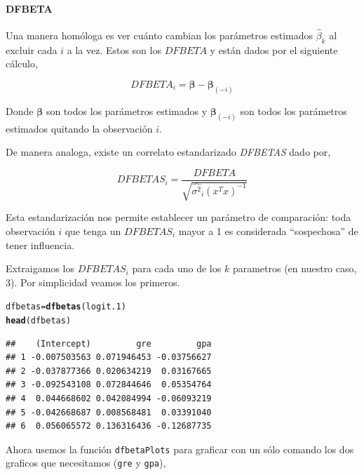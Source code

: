 \documentclass[onesided]{article}\usepackage[]{graphicx}\usepackage[]{color}
\makeatletter
\newcommand{\hlstd}[1]{\textcolor[rgb]{0.345,0.345,0.345}{#1}}%
\newcommand{\hlkwb}[1]{\textcolor[rgb]{0.69,0.353,0.396}{#1}}%
\newcommand{\hlkwd}[1]{\textcolor[rgb]{0.737,0.353,0.396}{\textbf{#1}}}%
\newenvironment{kframe}{%
 \def\at@end@of@kframe{}%
 \ifinner\ifhmode%
  \def\at@end@of@kframe{\end{minipage}}%
  \begin{minipage}{\columnwidth}%
 \fi\fi%
 \def\FrameCommand##1{\hskip\@totalleftmargin \hskip-\fboxsep
 \colorbox{shadecolor}{##1}\hskip-\fboxsep
     \hskip-\linewidth \hskip-\@totalleftmargin \hskip\columnwidth}%
 \MakeFramed {\advance\hsize-\width
   \@totalleftmargin\z@ \linewidth\hsize
   \@setminipage}}%
 {\par\unskip\endMakeFramed%
 \at@end@of@kframe}
\newenvironment{knitrout}{}{} %
\makeatother
\begin{document}
\paragraph{DFBETA} Una manera hom\'ologa es ver cu\'anto cambian los par\'ametros estimados $\hat\beta_{k}$ al excluir cada $i$ a la vez. Estos son los $DFBETA$ y est\'an dados por el siguiente c\'alculo,

\begin{equation}\label{DFBETA}
DFBETA_{i} = \bm{\beta}-\bm{\beta}_{(-i)}
\end{equation}

Donde $\bm{\beta}$ son todos los par\'ametros estimados y $\bm{\beta}_{(-i)}$ son todos los par\'ametros estimados quitando la observaci\'on $i$.

De manera analoga, existe un correlato estandarizado \emph{DFBETAS} dado por, 

\begin{equation}\label{DFBETA}
DFBETAS_{i} = \frac{DFBETA}{\sqrt{\hat{\sigma^{2}}_{i}(x^{T}x)^{-1}}}
\end{equation}

Esta estandarizaci\'on nos permite establecer un par\'ametro de comparaci\'on: toda observaci\'on $i$ que tenga un $DFBETAS_{i}$ mayor a 1 es considerada ``sospechosa'' de tener influencia.

Extraigamos los $DFBETAS_{i}$ para cada uno de los $k$ parametros (en nuestro caso, 3). Por simplicidad veamos los primeros.

\begin{knitrout}
\color{fgcolor}\begin{kframe}
\begin{alltt}
\hlstd{dfbetas} \hlkwb{=} \hlkwd{dfbetas}\hlstd{(logit.1)}
\hlkwd{head}\hlstd{(dfbetas)}
\end{alltt}
\begin{verbatim}
##    (Intercept)         gre         gpa
## 1 -0.007503563 0.071946453 -0.03756627
## 2 -0.037877366 0.020634219  0.03167665
## 3 -0.092543108 0.072844646  0.05354764
## 4  0.044668602 0.042084994 -0.06093219
## 5 -0.042668687 0.008568481  0.03391040
## 6  0.056065572 0.136316436 -0.12687735
\end{verbatim}
\end{kframe}
\end{knitrout}

Ahora usemos la funci\'on \texttt{dfbetaPlots} para graficar con un s\'olo comando los dos graficos que necesitamos (\texttt{gre} y \texttt{gpa}),
\end{document}
